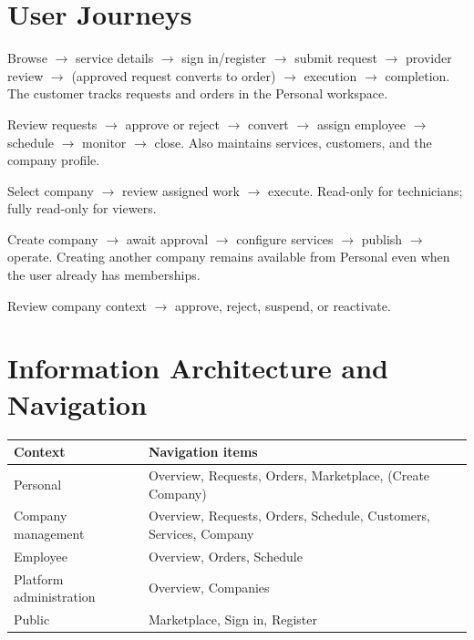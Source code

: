 \documentclass[11pt,a4paper]{article}
\begin{document}
\section{User Journeys}
\label{sec:journeys}

\begin{description}[leftmargin=2em, style=nextline]
  \item[Customer] Browse $\rightarrow$ service details $\rightarrow$ sign in/register $\rightarrow$ submit request $\rightarrow$ provider review $\rightarrow$ (approved request converts to order) $\rightarrow$ execution $\rightarrow$ completion. The customer tracks requests and orders in the Personal workspace.
  \item[Company Manager] Review requests $\rightarrow$ approve or reject $\rightarrow$ convert $\rightarrow$ assign employee $\rightarrow$ schedule $\rightarrow$ monitor $\rightarrow$ close. Also maintains services, customers, and the company profile.
  \item[Employee] Select company $\rightarrow$ review assigned work $\rightarrow$ execute. Read-only for technicians; fully read-only for viewers.
  \item[Company Owner] Create company $\rightarrow$ await approval $\rightarrow$ configure services $\rightarrow$ publish $\rightarrow$ operate. Creating another company remains available from Personal even when the user already has memberships.
  \item[Super Admin] Review company context $\rightarrow$ approve, reject, suspend, or reactivate.
\end{description}

\section{Information Architecture and Navigation}
\label{sec:ia}

\begin{longtable}{@{}L{4.6cm}L{9.8cm}@{}}
  \toprule
  \textbf{Context} & \textbf{Navigation items} \\
  \midrule
  \endhead
  Personal & Overview, Requests, Orders, Marketplace, (Create Company) \\
  Company management & Overview, Requests, Orders, Schedule, Customers, Services, Company \\
  Employee & Overview, Orders, Schedule \\
  Platform administration & Overview, Companies \\
  Public & Marketplace, Sign in, Register \\
  \bottomrule
\end{longtable}
\end{document}
